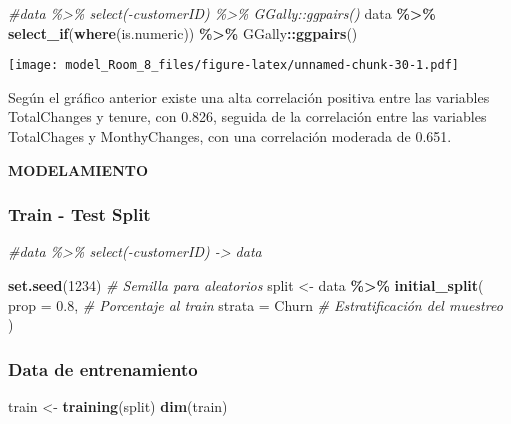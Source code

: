 \documentclass[
]{article}
\newenvironment{Shaded}{\begin{snugshade}}{\end{snugshade}}
\newcommand{\AttributeTok}[1]{\textcolor[rgb]{0.13,0.29,0.53}{#1}}
\newcommand{\CommentTok}[1]{\textcolor[rgb]{0.56,0.35,0.01}{\textit{#1}}}
\newcommand{\DecValTok}[1]{\textcolor[rgb]{0.00,0.00,0.81}{#1}}
\newcommand{\FloatTok}[1]{\textcolor[rgb]{0.00,0.00,0.81}{#1}}
\newcommand{\FunctionTok}[1]{\textcolor[rgb]{0.13,0.29,0.53}{\textbf{#1}}}
\newcommand{\NormalTok}[1]{#1}
\newcommand{\OtherTok}[1]{\textcolor[rgb]{0.56,0.35,0.01}{#1}}
\newcommand{\SpecialCharTok}[1]{\textcolor[rgb]{0.81,0.36,0.00}{\textbf{#1}}}
\begin{document}
\begin{Shaded}
\begin{Highlighting}[]
\CommentTok{\#data \%\textgreater{}\%  select({-}customerID) \%\textgreater{}\% GGally::ggpairs()}
\NormalTok{data }\SpecialCharTok{\%\textgreater{}\%}  \FunctionTok{select\_if}\NormalTok{(}\FunctionTok{where}\NormalTok{(is.numeric)) }\SpecialCharTok{\%\textgreater{}\%}\NormalTok{ GGally}\SpecialCharTok{::}\FunctionTok{ggpairs}\NormalTok{()}
\end{Highlighting}
\end{Shaded}

\texttt{[image: model\_Room\_8\_files/figure-latex/unnamed-chunk-30-1.pdf]}

Según el gráfico anterior existe una alta correlación positiva entre las
variables TotalChanges y tenure, con 0.826, seguida de la correlación
entre las variables TotalChages y MonthyChanges, con una correlación
moderada de 0.651.

\textbf{MODELAMIENTO}

\hypertarget{train---test-split}{%
\subsubsection{Train - Test Split}\label{train---test-split}}

\begin{Shaded}
\begin{Highlighting}[]
\CommentTok{\#data \%\textgreater{}\% select({-}customerID) {-}\textgreater{} data}

\FunctionTok{set.seed}\NormalTok{(}\DecValTok{1234}\NormalTok{) }\CommentTok{\# Semilla para aleatorios}
\NormalTok{split }\OtherTok{\textless{}{-}}\NormalTok{ data }\SpecialCharTok{\%\textgreater{}\%}
\FunctionTok{initial\_split}\NormalTok{(}
\AttributeTok{prop =} \FloatTok{0.8}\NormalTok{, }\CommentTok{\# Porcentaje al train}
\AttributeTok{strata =}\NormalTok{ Churn }\CommentTok{\# Estratificación del muestreo}
\NormalTok{)}
\end{Highlighting}
\end{Shaded}

\hypertarget{data-de-entrenamiento}{%
\subsubsection{Data de entrenamiento}\label{data-de-entrenamiento}}

\begin{Shaded}
\begin{Highlighting}[]
\NormalTok{train }\OtherTok{\textless{}{-}} \FunctionTok{training}\NormalTok{(split)}
\FunctionTok{dim}\NormalTok{(train)}
\end{Highlighting}
\end{Shaded}
\end{document}
